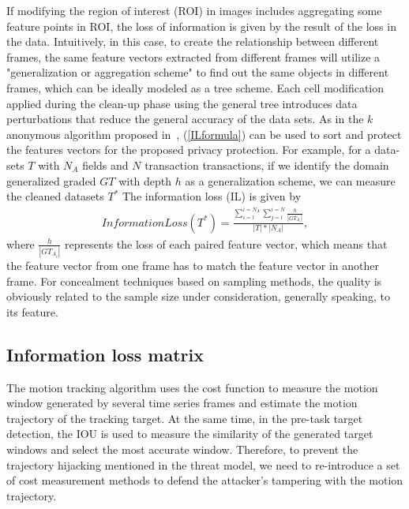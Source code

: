 \documentclass[trans]{IEEEtran}
\newcommand{\el}[1]{{\color{black}#1}}
\begin{document}
If modifying the region of interest (ROI) in images includes aggregating some feature points in ROI, the loss of information is given by the result of the loss in the data. Intuitively, in this case, to create the relationship between different frames, the same feature vectors extracted from different frames will utilize a "generalization or aggregation scheme" to find out the same objects in different frames, which can be ideally modeled as a tree scheme. Each cell modification applied during the clean-up phase using the general tree introduces data perturbations that reduce the general accuracy of the data sets. \el{ As in the $k$ anonymous algorithm proposed in~\cite{sweeney2002achieving}, (\ref{ILformula}) can be used to sort and protect the features vectors for the proposed privacy protection. For example, for a data-sets $ T $ with $ N_A $ fields and $ N $ transaction transactions, if we identify the domain generalized graded $GT$ with depth $h$ as a generalization scheme, we can measure the cleaned datasets $T^*$ The information loss (IL) is given by
\begin{eqnarray}\label{ILformula}
Information Loss(T^*)=\frac{\sum^{i=N_A}_{i=l} \sum^{i=N}_{j=l} \frac{h}{|GT_{A_i}|} }{|T|*|N_A|},
\end{eqnarray}
where $\frac{h}{|GT_{A_i}|}$ represents the loss of each paired feature vector, which means that the feature vector from one frame has to match the feature vector in another frame. For concealment techniques based on sampling methods, the quality is obviously related to the sample size under consideration, generally speaking, to its feature.}

\subsection{Information loss matrix}
The motion tracking algorithm uses the cost function to measure the motion window generated by several time series frames and estimate the motion trajectory of the tracking target. At the same time, in the pre-task target detection, the IOU is used to measure the similarity of the generated target windows and select the most accurate window. Therefore, to prevent the trajectory hijacking mentioned in the threat model, we need to re-introduce a set of cost measurement methods to \el{ defend} the attacker's tampering with the motion trajectory. 
\end{document}
